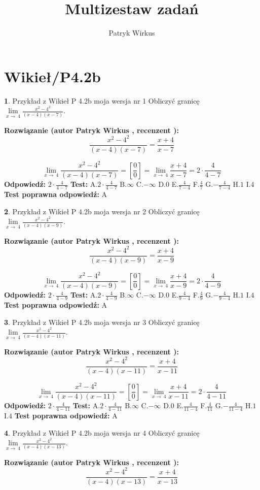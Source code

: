 \documentclass[12pt, a4paper]{article}
\title{Multizestaw zadań}
\author{Patryk Wirkus}
\date{}
\theoremstyle{definition} %
\newtheorem{zad}{}
\newcommand{\kategoria}[1]{\section{#1}}
\newcommand{\zadStart}[1]{\begin{zad}#1\newline}
\newcommand{\zadStop}{\end{zad}}
\newcommand{\rozwStart}[2]{\noindent \textbf{Rozwiązanie (autor #1 , recenzent #2): }\newline}
\newcommand{\rozwStop}{\newline}
\newcommand{\odpStart}{\noindent \textbf{Odpowiedź:}\newline}
\newcommand{\odpStop}{\newline}
\newcommand{\testStart}{\noindent \textbf{Test:}\newline}
\newcommand{\testStop}{\newline}
\newcommand{\kluczStart}{\noindent \textbf{Test poprawna odpowiedź:}\newline}
\newcommand{\kluczStop}{\newline}
\begin{document}
\maketitle

\kategoria{Wikieł/P4.2b}


\zadStart{Przykład z Wikieł P 4.2b moja wersja nr 1}
Obliczyć granicę $\lim\limits_{x\to\ 4}\frac{x^{2}-4^{2}}{(x-4)(x-7)}$.
\zadStop
\rozwStart{Patryk Wirkus}{}
$$\frac{x^{2}-4^{2}}{(x-4)(x-7)}=\frac{x+4}{x-7}$$

$$\lim\limits_{x\to\ 4}\frac{x^{2}-4^{2}}{(x-4)(x-7)}=[\frac{0}{0}]=\lim\limits_{x\to\ 4}\frac{x+4}{x-7}=2 \cdot \frac{4}{4-7}$$
\rozwStop
\odpStart
$2 \cdot \frac{4}{4-7}$
\odpStop
\testStart
A.$2 \cdot \frac{4}{4-7}$
B.$\infty$
C.$-\infty$
D.$0$
E.$\frac{4}{7-4}$
F.$\frac{4}{7}$
G.$-\frac{4}{7-4}$
H.$1$
I.$4$
\testStop
\kluczStart
A
\kluczStop



\zadStart{Przykład z Wikieł P 4.2b moja wersja nr 2}
Obliczyć granicę $\lim\limits_{x\to\ 4}\frac{x^{2}-4^{2}}{(x-4)(x-9)}$.
\zadStop
\rozwStart{Patryk Wirkus}{}
$$\frac{x^{2}-4^{2}}{(x-4)(x-9)}=\frac{x+4}{x-9}$$

$$\lim\limits_{x\to\ 4}\frac{x^{2}-4^{2}}{(x-4)(x-9)}=[\frac{0}{0}]=\lim\limits_{x\to\ 4}\frac{x+4}{x-9}=2 \cdot \frac{4}{4-9}$$
\rozwStop
\odpStart
$2 \cdot \frac{4}{4-9}$
\odpStop
\testStart
A.$2 \cdot \frac{4}{4-9}$
B.$\infty$
C.$-\infty$
D.$0$
E.$\frac{4}{9-4}$
F.$\frac{4}{9}$
G.$-\frac{4}{9-4}$
H.$1$
I.$4$
\testStop
\kluczStart
A
\kluczStop



\zadStart{Przykład z Wikieł P 4.2b moja wersja nr 3}
Obliczyć granicę $\lim\limits_{x\to\ 4}\frac{x^{2}-4^{2}}{(x-4)(x-11)}$.
\zadStop
\rozwStart{Patryk Wirkus}{}
$$\frac{x^{2}-4^{2}}{(x-4)(x-11)}=\frac{x+4}{x-11}$$

$$\lim\limits_{x\to\ 4}\frac{x^{2}-4^{2}}{(x-4)(x-11)}=[\frac{0}{0}]=\lim\limits_{x\to\ 4}\frac{x+4}{x-11}=2 \cdot \frac{4}{4-11}$$
\rozwStop
\odpStart
$2 \cdot \frac{4}{4-11}$
\odpStop
\testStart
A.$2 \cdot \frac{4}{4-11}$
B.$\infty$
C.$-\infty$
D.$0$
E.$\frac{4}{11-4}$
F.$\frac{4}{11}$
G.$-\frac{4}{11-4}$
H.$1$
I.$4$
\testStop
\kluczStart
A
\kluczStop



\zadStart{Przykład z Wikieł P 4.2b moja wersja nr 4}
Obliczyć granicę $\lim\limits_{x\to\ 4}\frac{x^{2}-4^{2}}{(x-4)(x-13)}$.
\zadStop
\rozwStart{Patryk Wirkus}{}
$$\frac{x^{2}-4^{2}}{(x-4)(x-13)}=\frac{x+4}{x-13}$$
\end{document}
